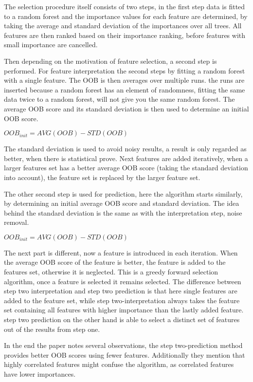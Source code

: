 \npar

The selection procedure itself consists of two steps, in the first step data is fitted to a random forest and the importance values for each feature are determined, by taking the average and standard deviation of the importances over all trees. All features are then ranked based on their importance ranking, before features with small importance are cancelled. 

\npar

Then depending on the motivation of feature selection, a second step is performed. For feature interpretation the second steps by fitting a random forest with a single feature. The OOB is then averages over multiple runs. the runs are inserted because a random forest has an element of randomness, fitting the same data twice to a random forest, will not give you the same random forest. The average OOB score and its standard deviation is then used to determine an initial OOB score.

\begin{center}
$OOB_{init} = AVG(OOB) - STD(OOB)$
\end{center}

The standard deviation is used to avoid noisy results, a result is only regarded as better, when there is statistical prove. Next features are added iteratively, when a larger features set has a better average OOB score (taking the standard deviation into account), the feature set is replaced by the larger feature set.

\npar

The other second step is used for prediction, here the algorithm starts similarly, by determining an initial average OOB score and standard deviation. The idea behind the standard deviation is the same as with the interpretation step, noise removal.

\begin{center}
$OOB_{init} = AVG(OOB) - STD(OOB)$
\end{center}

The next part is different, now a feature is introduced in each iteration. When the average OOB score of the feature is better, the feature is added to the features set, otherwise it is neglected. This is a greedy forward selection algorithm, once a feature is selected it remains selected. The difference between step two interpretation and step two prediction is that here single features are added to the feature set, while step two-interpretation always takes the feature set containing all features with higher importance than the lastly added feature. step two prediction on the other hand is able to select a distinct set of features out of the results from step one.

\npar

In the end the paper notes several observations, the step two-prediction method provides better OOB scores using fewer features. Additionally they mention that highly correlated features might confuse the algorithm, as correlated features have lower importances.